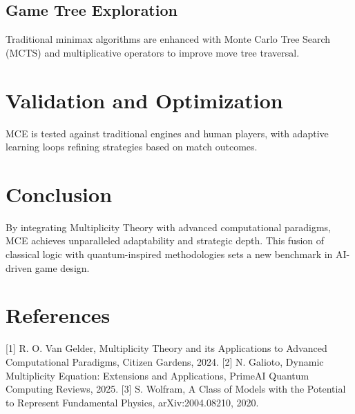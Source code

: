 \documentclass{article}
\begin{document}
\subsection{Game Tree Exploration} Traditional minimax algorithms are enhanced with Monte Carlo Tree Search (MCTS) and multiplicative operators to improve move tree traversal.

\section{Validation and Optimization} MCE is tested against traditional engines and human players, with adaptive learning loops refining strategies based on match outcomes.

\section{Conclusion} By integrating Multiplicity Theory with advanced computational paradigms, MCE achieves unparalleled adaptability and strategic depth. This fusion of classical logic with quantum-inspired methodologies sets a new benchmark in AI-driven game design.

\section*{References} [1] R. O. Van Gelder, Multiplicity Theory and its Applications to Advanced Computational Paradigms, Citizen Gardens, 2024.
[2] N. Galioto, Dynamic Multiplicity Equation: Extensions and Applications, PrimeAI Quantum Computing Reviews, 2025.
[3] S. Wolfram, A Class of Models with the Potential to Represent Fundamental Physics, arXiv:2004.08210, 2020.
\end{document}
